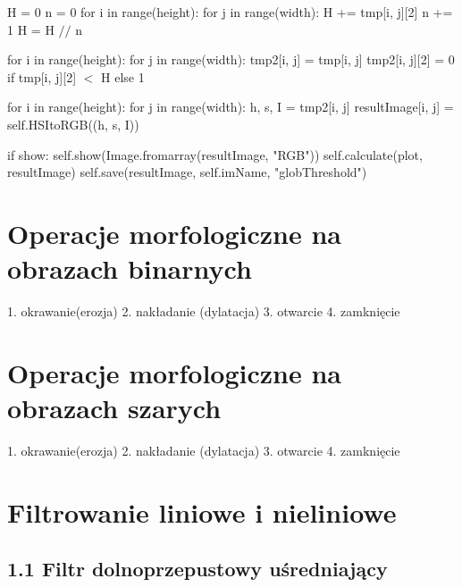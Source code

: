 \documentclass[final,a4paper,openany,12pt]{mwbk}
\begin{document}
\noindent H = 0 \newline
n = 0 \newline
for i in range(height): \newline
for j in range(width): \newline
H += tmp[i, j][2] \newline
n += 1 \newline
H = H $//$ n \newline

\noindent for i in range(height): \newline
for j in range(width): \newline
tmp2[i, j] = tmp[i, j] \newline
tmp2[i, j][2] = 0 if tmp[i, j][2] $<$ H else 1 \newline

\noindent for i in range(height): \newline
for j in range(width): \newline
h, s, I = tmp2[i, j] \newline
resultImage[i, j] = self.HSItoRGB((h, s, I)) \newline

\noindent if show: \newline
self.show(Image.fromarray(resultImage, "RGB")) \newline
self.calculate(plot, resultImage) \newline
self.save(resultImage, self.imName, "globThreshold") \newline
\newpage


\chapter{Operacje morfologiczne na obrazach binarnych}
1. okrawanie(erozja)
2. nakładanie (dylatacja)
3. otwarcie
4. zamknięcie

\chapter {Operacje morfologiczne na obrazach szarych}
1. okrawanie(erozja)
2. nakładanie (dylatacja)
3. otwarcie
4. zamknięcie

\chapter {Filtrowanie liniowe i nieliniowe}
\newpage


\section*{1.1 Filtr dolnoprzepustowy uśredniający}
\end{document}
